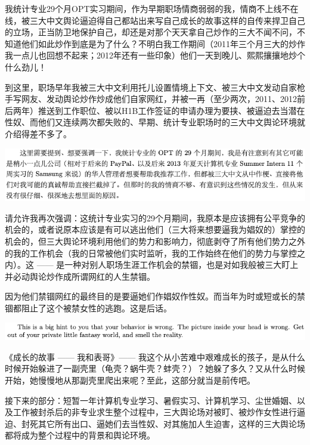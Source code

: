 \documentclass[9pt, b5paper]{article}
\begin{document}
我统计专业29个月OPT实习期间，作为早期职场情商弱弱的我，情商不上线不在线，被三大中文舆论逼迫得自己都站出来写自己成长的故事这样的自传来捍卫自己的立场，正当防卫地保护自己，却还是对那个天天拿自己炒作的三大不闻不问，不知道他们如此炒作到底是为了什么？不明白我工作期间（2011年三个月三大的炒作我一点儿也回想不起来；2012年还有一些印象）他们一天到晚儿、熙熙攘攘地炒个什么劲儿！

到这里，职场早年我被三大中文利用托儿设置情境上下文、被三大中文发动自家枪手写网友、发动舆论炒作炒成他们自家网红，并被一再（至少两次，2011、2012前后两年）推送到工作职位、被以H1B工作签证的申请办理为要挟、被逼迫去当潜在性奴、而他们又连续两次都失败的、早期、统计专业职场时的三大中文舆论环境就介绍得差不多了。

\begin{center}
\includegraphics[width=.9\linewidth]{./pic/backups_plans_20210417_232040.png}
\end{center}

请允许我再次强调：这统计专业实习的29个月期间，我原本是应该拥有公平竞争的机会的，或者说原本应该是有可以逃出他们（三大将来想要逼我为娼奴的）掌控的机会的，但三大舆论环境利用他们的势力和影响力，彻底剥夺了所有他们势力之外的我的工作机会（我的日常被他们实时监听，我的工作始终在他们的势力与掌控之内）。这 —— 是一种对别人职场生涯工作机会的禁锢，也是对如我般被三大盯上并必动舆论炒作成所谓网红的人生禁锢。

因为他们禁锢网红的最终目的是要逼她们作娼奴作性奴。而当年为时或短或长的禁锢都阻止了这个被禁女性的逃跑。这是后话。

\begin{center}
\includegraphics[width=.9\linewidth]{./pic/backups_plans_20210417_235535.png}
\end{center}

《成长的故事 —— 我和表哥》—— 我这个从小苦难中艰难成长的孩子，是从什么时候开始躲进了一副壳里（龟壳？蜗牛壳？蚌壳？）？她躲了多久？又从什么时候开始，她慢慢地从那副壳里爬出来呢？至此，这部分就当是前传吧。

接下来的部分：短暂一年计算机专业学习、暑假实习、计算机学习、尘世婚姻、以及工作被封杀后的非专业求生整个过程中，三大舆论场对被盯、被炒作女性进行逼迫、封死其它所有出口、逼她们去当性奴、对其施加人生迫害，这样的三大舆论场都将成为整个过程中的背景和舆论环境。
\end{document}
